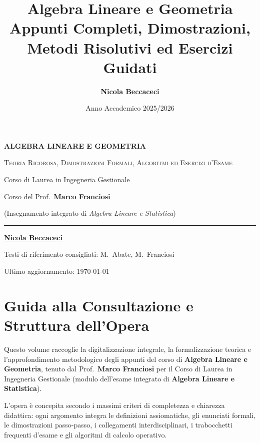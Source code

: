 \documentclass[11pt,a4paper,twoside,openright]{book}
\title{\Huge\textbf{\textsf{Algebra Lineare e Geometria}}\\[0.5em]
\Large\textsf{Appunti Completi, Dimostrazioni, Metodi Risolutivi ed Esercizi Guidati}}
\author{\textbf{\textsf{Nicola Beccaceci}}}
\date{\textsf{Anno Accademico 2025/2026}}
\begin{document}
\frontmatter
\begin{titlepage}
    \centering
    \vspace*{1.5cm}
    {\Huge\bfseries\color{navyblue} ALGEBRA LINEARE E GEOMETRIA\par}
    \vspace{0.6cm}
    {\Large\scshape Teoria Rigorosa, Dimostrazioni Formali, Algoritmi ed Esercizi d'Esame\par}
    \vspace{0.8cm}
    {\large Corso di Laurea in Ingegneria Gestionale\par}
    \vspace{0.3cm}
    {\normalsize Corso del Prof.~\textbf{Marco Franciosi}\par}
    {\small (Insegnamento integrato di \emph{Algebra Lineare e Statistica})\par}
    \vfill
    \rule{0.6\textwidth}{1pt}\par
    \vspace{0.8cm}
    {\large\textbf{\underline{Nicola Beccaceci}}\par}
    \vspace{0.4cm}
    {\small Testi di riferimento consigliati: M.~Abate, M.~Franciosi\par}
    \vspace{0.2cm}
    {\small Ultimo aggiornamento: \today\par}
    \vspace*{1.5cm}
\end{titlepage}

\tableofcontents
\cleardoublepage

\chapter*{Guida alla Consultazione e Struttura dell'Opera}
Questo volume raccoglie la digitalizzazione integrale, la formalizzazione teorica e l'approfondimento metodologico degli appunti del corso di \textbf{Algebra Lineare e Geometria}, tenuto dal Prof.~\textbf{Marco Franciosi} per il Corso di Laurea in Ingegneria Gestionale (modulo dell'esame integrato di \textbf{Algebra Lineare e Statistica}).

L'opera è concepita secondo i massimi criteri di completezza e chiarezza didattica: ogni argomento integra le definizioni assiomatiche, gli enunciati formali, le dimostrazioni passo-passo, i collegamenti interdisciplinari, i trabocchetti frequenti d'esame e gli algoritmi di calcolo operativo.
\end{document}
